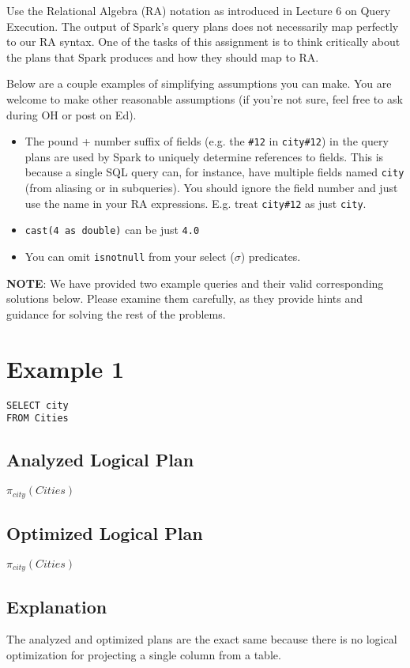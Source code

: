 \documentclass[12pt]{article}
\begin{document}
Use the Relational Algebra (RA) notation as introduced in Lecture 6 on Query Execution.
The output of Spark's query plans does not necessarily map perfectly to our RA syntax.
One of the tasks of this assignment is to think
critically about the plans that Spark produces and how they should map
to RA.

Below are a couple examples of simplifying assumptions you can make.
You are welcome to make other reasonable assumptions (if you're not sure,
feel free to ask during OH or post on Ed).
\begin{itemize}
    \item The pound + number suffix of fields
        (e.g. the \verb|#12| in \verb|city#12|)
        in the query plans are
        used by Spark to uniquely determine references to fields.
        This is because a single SQL query can, for instance, have multiple
        fields named \verb|city| (from aliasing or in subqueries).
        You should ignore the field number and just use the name in your
        RA expressions.
        E.g. treat \verb|city#12| as just \verb|city|.
    \item \verb|cast(4 as double)| can be just \verb|4.0|
    \item You can omit \texttt{isnotnull} from your select ($\sigma$) predicates.
\end{itemize}

\textbf{NOTE}:
We have provided two example queries and their valid corresponding solutions below.
Please examine them carefully, as they provide hints and guidance for solving the rest of the problems.

\section*{Example 1}
\begin{verbatim}
SELECT city
FROM Cities
\end{verbatim}

\subsection*{Analyzed Logical Plan}
$\pi_{city}(Cities)$

\subsection*{Optimized Logical Plan}
$\pi_{city}(Cities)$

\subsection*{Explanation}
The analyzed and optimized plans are the exact same because there is no
logical optimization for projecting a single column from a table.
\end{document}
